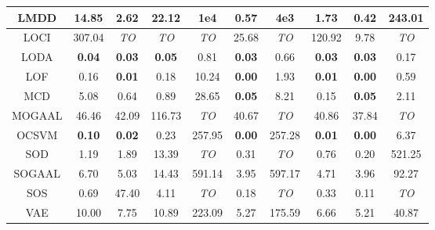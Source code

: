 \begin{table}[!t]
\begin{center}
\begin{small}
\begin{tabular}{|c|c|c|c|c|c|c|c|c|c|}
\hline
LMDD &               14.85 &             2.62 &           22.12 &       1e4 &           0.57 &       4e3 &                1.73 &            0.42 &         243.01 \\
\hline
LOCI &              307.04 &      \textit{TO} &     \textit{TO} &    \textit{TO} &          25.68 &   \textit{TO} &              120.92 &            9.78 &    \textit{TO} \\
\hline
LODA &       \textbf{0.04} &    \textbf{0.03} &   \textbf{0.05} &           0.81 &  \textbf{0.03} &          0.66 &       \textbf{0.03} &   \textbf{0.03} &           0.17 \\
\hline
LOF &                0.16 &    \textbf{0.01} &            0.18 &          10.24 &  \textbf{0.00} &          1.93 &       \textbf{0.01} &   \textbf{0.00} &           0.59 \\
\hline
MCD &                5.08 &             0.64 &            0.89 &          28.65 &  \textbf{0.05} &          8.21 &                0.15 &   \textbf{0.05} &           2.11 \\
\hline
MOGAAL &               46.46 &            42.09 &          116.73 &    \textit{TO} &          40.67 &   \textit{TO} &               40.86 &           37.84 &    \textit{TO} \\
\hline
OCSVM &       \textbf{0.10} &    \textbf{0.02} &            0.23 &         257.95 &  \textbf{0.00} &        257.28 &       \textbf{0.01} &   \textbf{0.00} &           6.37 \\
\hline
SOD &                1.19 &             1.89 &           13.39 &    \textit{TO} &           0.31 &   \textit{TO} &                0.76 &            0.20 &         521.25 \\
\hline
SOGAAL &                6.70 &             5.03 &           14.43 &         591.14 &           3.95 &        597.17 &                4.71 &            3.96 &          92.27 \\
\hline
SOS &                0.69 &            47.40 &            4.11 &    \textit{TO} &           0.18 &   \textit{TO} &                0.33 &            0.11 &    \textit{TO} \\
\hline
VAE &               10.00 &             7.75 &           10.89 &         223.09 &           5.27 &        175.59 &                6.66 &            5.21 &          40.87 \\
\hline
\end{tabular}
\end{small}
\end{center}
\vskip -0.1in
\end{table}


